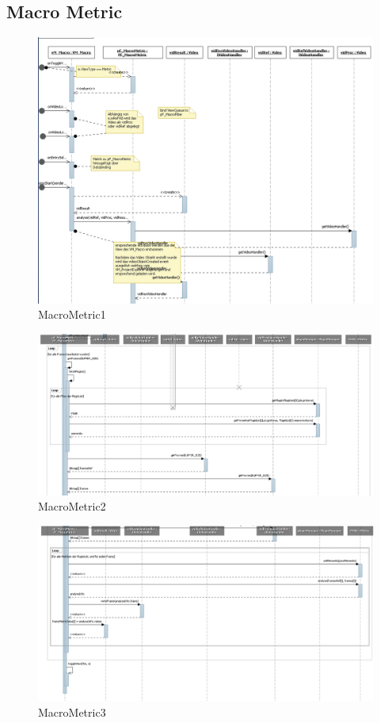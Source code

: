 \subsection{Macro Metric}
\begin{figure}[H]
\includegraphics[width=\linewidth]{bilder/Sequenzdiagramm/MacroMetric1.png}
\caption{MacroMetric1}
\end{figure}

\begin{figure}[H]
\includegraphics[width=\linewidth]{bilder/Sequenzdiagramm/MacroMetric2.png}
\caption{MacroMetric2}
\end{figure}

\begin{figure}[H]
\includegraphics[width=\linewidth]{bilder/Sequenzdiagramm/MacroMetric3.png}
\caption{MacroMetric3}
\end{figure}



